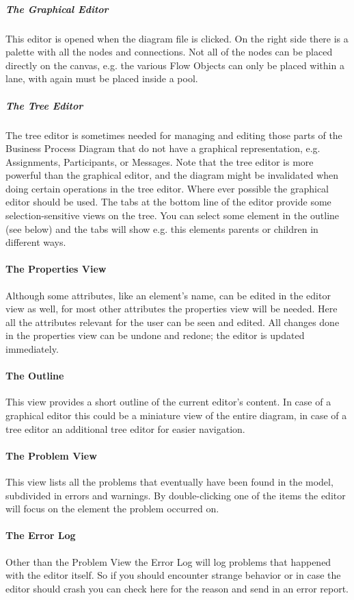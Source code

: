 \subparagraph*{The Graphical Editor}
This editor is opened when the diagram file is clicked. On the right side there is a palette with all the nodes and connections. Not all of the nodes can be placed directly on the canvas, e.g. the various Flow Objects can only be placed within a lane, with again must be placed inside a pool.

\subparagraph*{The Tree Editor}
The tree editor is sometimes needed for managing and editing those parts of the Business Process Diagram that do not have a graphical representation, e.g. Assignments, Participants, or Messages. Note that the tree editor is more powerful than the graphical editor, and the diagram might be invalidated when doing certain operations in the tree editor. Where ever possible the graphical editor should be used. The tabs at the bottom line of the editor provide some selection-sensitive views on the tree. You can select some element in the outline (see below) and the tabs will show e.g. this elements parents or children in different ways.

\paragraph*{The Properties View}
Although some attributes, like an element's name, can be edited in the editor view as well, for most other attributes the properties view will be needed. Here all the attributes relevant for the user can be seen and edited. All changes done in the properties view can be undone and redone; the editor is updated immediately.

\paragraph*{The Outline}
This view provides a short outline of the current editor's content. In case of a graphical editor this could be a miniature view of the entire diagram, in case of a tree editor an additional tree editor for easier navigation. 

\paragraph*{The Problem View}
This view lists all the problems that eventually have been found in the model, subdivided in errors and warnings. By double-clicking one of the items the editor will focus on the element the problem occurred on.

\paragraph*{The Error Log}
Other than the Problem View the Error Log will log problems that happened with the editor itself. So if you should encounter strange behavior or in case the editor should crash you can check here for the reason and send in an error report.



